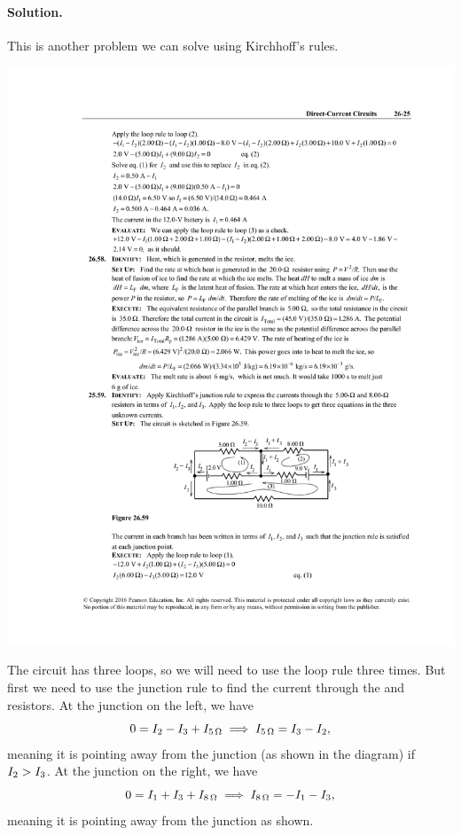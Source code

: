 \documentclass[11pt]{article}
\newcommand{\beq}{\begin{equation*}}
\newcommand{\eeq}{\end{equation*}}
\newenvironment{solution}
{
    \paragraph{Solution.}
    \ignorespaces
}
{
    \bigskip
}
\begin{document}
\begin{solution}
	This is another problem we can solve using Kirchhoff's rules.
	
	\begin{center}
		\includegraphics{A26-59}
	\end{center}
	
		The circuit has three loops, so we will need to use the loop rule three times.  But first we need to use the junction rule to find the current through the  and  resistors.  At the junction on the left, we have
	\beq
		0 = \Iw - \Ie + I_{\Sohm{5}}
		\implies
		I_{\Sohm{5}} = \Ie - \Iw,
	\eeq
	meaning it is pointing away from the junction (as shown in the diagram) if $I_2 > I_3$.  At the junction on the right, we have
	\beq
		0 = \Iq + \Ie + I_{\Sohm{8}}
		\implies
		I_{\Sohm{8}} = -\Iq - \Ie,
	\eeq
	meaning it is pointing away from the junction as shown.
	

\end{solution}
\end{document}
